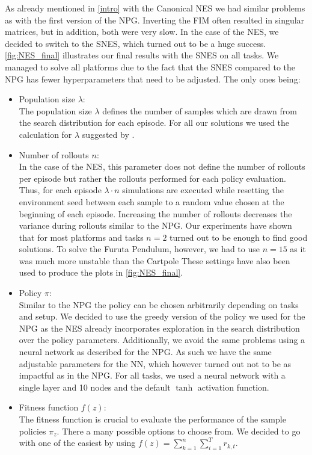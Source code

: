 As already mentioned in \autoref{intro} with the Canonical NES we had similar problems as with the first version of the NPG. Inverting the FIM often resulted in singular matrices, but in addition, both were very slow. In the case of the NES, we decided to switch to the SNES, which turned out to be a huge success. \autoref{fig:NES_final} illustrates our final results with the SNES on all tasks. We managed to solve all platforms due to the fact that the SNES compared to the NPG has fewer hyperparameters that need to be adjusted. The only ones being:
\begin{itemize}
  \item Population size $\lambda$: \\
  The population size $\lambda$ defines the number of samples which are drawn from the search distribution for each episode. For all our solutions we used the calculation for $\lambda$ suggested by \cite{Wierstra14}. \smallskip
  \item Number of rollouts $n$: \\
  In the case of the NES, this parameter does not define the number of rollouts per episode but rather the rollouts performed for each policy evaluation. Thus, for each episode $\lambda \cdot n$ simulations are executed while resetting the environment seed between each sample to a random value chosen at the beginning of each episode. Increasing the number of rollouts decreases the variance during rollouts similar to the NPG. Our experiments have shown that for most platforms and tasks $n=2$ turned out to be enough to find good solutions. To solve the Furuta Pendulum, however, we had to use $n=15$ as it was much more unstable than the Cartpole These settings have also been used to produce the plots in \autoref{fig:NES_final}. \smallskip
  \item Policy $\pi$: \\
  Similar to the NPG the policy can be chosen arbitrarily depending on tasks and setup. We decided to use the greedy version of the policy we used for the NPG as the NES already incorporates exploration in the search distribution over the policy parameters. Additionally, we avoid the same problems using a neural network as described for the NPG. As such we have the same adjustable parameters for the NN, which however turned out not to be as impactful as in the NPG. For all tasks, we used a neural network with a single layer and 10 nodes and the default $\tanh$ activation function. \smallskip
  \item Fitness function $f(z)$: \\
  The fitness function is crucial to evaluate the performance of the sample policies $\pi_z$. There a many possible options to choose from. We decided to go with one of the easiest by using $f(z) = \sum_{k=1}^{n} \sum_{i=1}^{T} r_{k,t}$.
\end{itemize}

